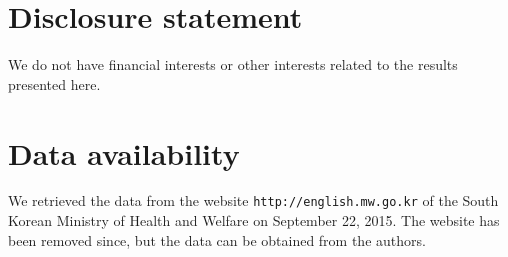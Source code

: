 \documentclass[12pt,usenatbib,referee]{article}
\begin{document}
\section*{Disclosure statement}

We do not have financial interests or other interests related to the results presented here.

\section*{Data availability}

We retrieved the data from the website {\tt http://english.mw.go.kr} of the South Korean Ministry of Health and Welfare on September 22, 2015.
The website has been removed since,
but the data can be obtained from the authors.

%

%




\mbox{}

\newpage
\end{document}

